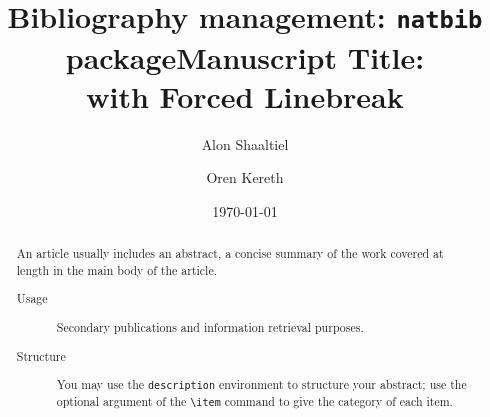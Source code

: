 \documentclass[reprint,amsmath,amssymb,aps, prl]{revtex4-2}
\title{Bibliography management: \texttt{natbib} package}
\begin{document}

\title{Manuscript Title:\\with Forced Linebreak}%


\author{Alon Shaaltiel}
\author{Oren Kereth}



\date{\today}%

\begin{abstract}
An article usually includes an abstract, a concise summary of the work
covered at length in the main body of the article. 
\begin{description}
\item[Usage]
Secondary publications and information retrieval purposes.
\item[Structure]
You may use the \texttt{description} environment to structure your abstract;
use the optional argument of the \verb+\item+ command to give the category of each item. 
\end{description}
\end{abstract}

\maketitle
\renewcommand*{\thesection}{\arabic{section}}
\renewcommand*{\thesubsection}{\arabic{section}.\arabic{subsection}}
\end{document}
